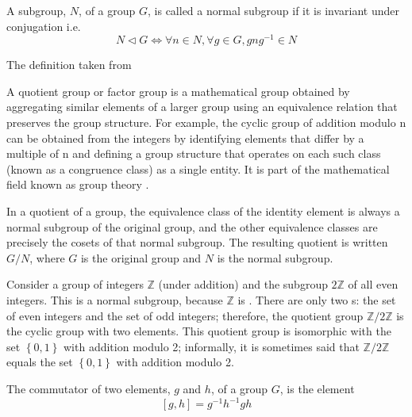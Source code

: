 \begin{appendices}
\begin{definition}
  A subgroup, $N$, of a group $G$, is called a normal subgroup if it
  is invariant under conjugation i.e. 
  \[
  N \triangleleft G \Leftrightarrow
  \forall n \in N, \forall g \in G, g n g^{-1} \in N
  \]
  
  The definition taken from \cite{wiki:normalsubgroup}
  \label{def:normalsubgroup}
\end{definition}

\begin{definition}
  A quotient group or factor group is a mathematical group obtained by
  aggregating similar elements of a larger group using an equivalence
  relation that preserves the group structure. For example, the cyclic
  group of addition modulo n can be obtained from the integers by
  identifying elements that differ by a multiple of n and defining a
  group structure that operates on each such class (known as a
  congruence class) as a single entity. It is part of the mathematical
  field known as group theory \cite{wiki:quotientgroup}. 

  In a quotient of a group, the equivalence class of the identity
  element is always a normal subgroup of the original group, and the
  other equivalence classes are precisely the cosets of that normal
  subgroup. The resulting quotient is written $G / N$, where $G$ is the
  original group and $N$ is the normal subgroup. 
  \label{def:quotientgroup}
\end{definition}

\begin{example}
  Consider \cite{wiki:quotientgroup} a group of integers $\mathbb{Z}$
  (under addition) and the 
  subgroup $2\mathbb{Z}$ of all even integers. This is a normal
  subgroup, because $\mathbb{Z}$ is . There
  are only two s: the set 
  of even integers and the set of odd integers; therefore, the
  quotient group $\mathbb{Z}/2\mathbb{Z}$ is the cyclic group with two
  elements. This 
  quotient group is isomorphic with the set $\left\{ 0, 1 \right\}$
  with addition modulo 2; informally, it is sometimes said that
  $\mathbb{Z}/2\mathbb{Z}$
  equals the set $\left\{ 0, 1 \right\}$ with addition modulo 2. 
  \label{ex:quotientgroup}
\end{example}

\begin{definition}[Commutator]
  The commutator of two elements, $g$ and $h$, of a group $G$, is the
  element \cite{wiki:commutator}
  \[
  \left[g, h\right] = g^{-1} h^{-1} g h
  \]
  \label{def:commutator}
\end{definition}


\end{appendices}

